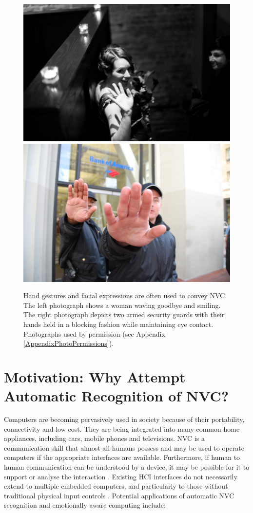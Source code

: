 \begin{figure}[tb]
\centering
\includegraphics[width = 0.49 \columnwidth]{introduction/wavegoodbye3420075962_ebae9c3a90_o.jpg}
\includegraphics[width = 0.49 \columnwidth]{introduction/security2347593532_a4f7fe8250_b.jpg}
\caption[Hand gestures and facial expressions are often used to convey \ac{NVC}.]{Hand gestures and facial expressions are often used to convey \ac{NVC}. The left photograph shows a woman waving goodbye and smiling. The right photograph depicts two armed security guards with their hands held in a blocking fashion while maintaining eye contact. Photographs used by permission (see Appendix \ref{AppendixPhotoPermissions}).}
\label{FigureManualGestureNvc}
\end{figure}

\section[Motivation: Why Attempt Automatic Recognition?]{Motivation: Why Attempt Automatic Recognition of \ac{NVC}?}

Computers are becoming pervasively used in society because of their portability, connectivity and low cost. They are being integrated into many common home appliances, including cars, mobile phones and televisions. \ac{NVC} is a communication skill that almost all humans possess and may be used to operate computers if the appropriate interfaces are available. Furthermore, if human to human communication can be understood by a device, it may be possible for it to support or analyse the interaction \cite{Nakatsu98}. Existing \ac{HCI} interfaces do not necessarily extend to multiple embedded computers, and particularly to those without traditional physical input controls \cite{Pantic2008}. Potential applications of automatic \ac{NVC} recognition and emotionally aware computing include:

